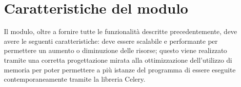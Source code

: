 \section{Caratteristiche del modulo}

Il modulo, oltre a fornire tutte le funzionalità descritte precedentemente, deve avere le
seguenti caratteristiche: deve essere scalabile e performante per permettere un aumento o diminuzione delle risorse; questo viene realizzato tramite una corretta progettazione mirata alla ottimizzazione dell'utilizzo di memoria per poter permettere a più istanze del programma di essere eseguite contemporaneamente tramite la libreria Celery.